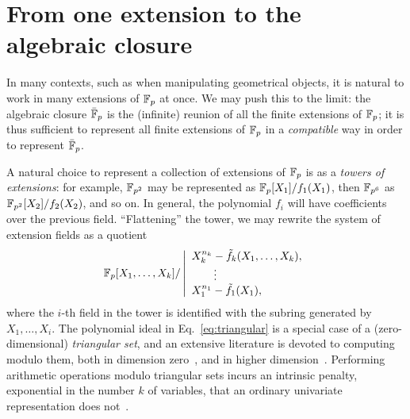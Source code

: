 \documentclass{report}
\theoremstyle{plain}
\theoremstyle{definition}
\begin{document}

\section{From one extension to the algebraic closure}

In many contexts, such as when manipulating geometrical objects, it is
natural to work in many extensions of $\mathbb{F}_p$ at once. %
We may push this to the limit: the algebraic closure $\bar{\mathbb{F}}_p$ is
the (infinite) reunion of all the finite extensions of $\mathbb{F}_p$; it is
thus sufficient to represent all finite extensions of $\mathbb{F}_p$ in a
\emph{compatible} way in order to represent $\bar{\mathbb{F}}_p$.

A natural choice to represent a collection of extensions of $\mathbb{F}_p$ is
as a \emph{towers of extensions}: for example, $\mathbb{F}_{p^2}$ may be
represented as $\mathbb{F}_{p}[X_1]/f_1(X_1)$, then $\mathbb{F}_{p^6}$ as
$\mathbb{F}_{p^2}[X_2]/f_2(X_2)$, and so on. %
In general, the polynomial $f_i$ will have coefficients over the
previous field. %
``Flattening'' the tower, we may rewrite the system of extension
fields as a quotient
\begin{equation}
  \label{eq:triangular}
  \mathbb{F}_p[X_1,\dots,X_k] /
  \left|\begin{array}{l}
          X_k^{n_k} - \tilde{f}_k(X_1,\dots,X_k),\\
          \qquad\vdots\\
          X_1^{n_1} - \tilde{f}_1(X_1),
        \end{array}\right.
\end{equation}
where the $i$-th field in the tower is identified with the subring
generated by $X_1,\dots,X_i$. %
The polynomial ideal in Eq.~\eqref{eq:triangular} is a special case of
a (zero-dimensional) \emph{triangular set}, and an extensive
literature is devoted to computing modulo them, both in dimension
zero~\cite{LEBRETON2015230,PoSc13b}, and in higher
dimension~\cite{Aubry:1999:TTS:2947511.2947551}. %
Performing arithmetic operations modulo triangular sets incurs an
intrinsic penalty, exponential in the number $k$ of variables, that an
ordinary univariate representation does
not~\cite{canny+kaltofen+yagati89,li+moreno+schost07,vanderHoeven:2004:TFT:1005285.1005327}. %
\end{document}
